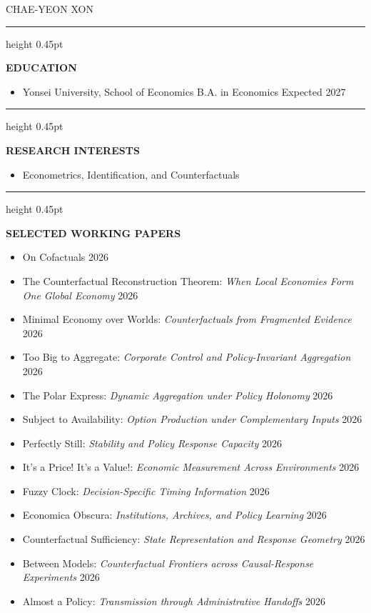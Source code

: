 \documentclass[11pt,letterpaper]{article}
\newcommand{\cvsection}[1]{%
  \par\vspace{0.24in}%
  {\color{cvgray}\hrule height 0.45pt}
  \vspace{0.16in}%
  {\color{cvgray}\fontsize{9.2}{11}\selectfont\bfseries\MakeUppercase{#1}}%
  \par\vspace{0.11in}%
}
\newcommand{\firstcvsection}[1]{%
  \par\vspace{0.11in}%
  {\color{cvgray}\hrule height 0.45pt}
  \vspace{0.16in}%
  {\color{cvgray}\fontsize{9.2}{11}\selectfont\bfseries\MakeUppercase{#1}}%
  \par\vspace{0.09in}%
}
\newenvironment{cvitems}{%
  \begin{itemize}[label={\textcolor{cvgray}{--}},leftmargin=0.28in,labelsep=0.09in,itemsep=0.105in,topsep=0pt,parsep=0pt,partopsep=0pt]
}{\end{itemize}}
\newenvironment{cvtightitems}{%
  \begin{itemize}[label={\textcolor{cvgray}{--}},leftmargin=0.28in,labelsep=0.09in,itemsep=0.110in,topsep=0pt,parsep=0pt,partopsep=0pt]
}{\end{itemize}}
\begin{document}
\thispagestyle{fancy}

\begin{center}
  {\fontsize{21}{25}\selectfont{}\selectfont CHAE-YEON XON}
\end{center}
\vspace{0.04in}

\firstcvsection{Education}
\begin{cvitems}
  \item Yonsei University, School of Economics \textbullet{} B.A. in Economics \textbullet{} Expected 2027
\end{cvitems}

\cvsection{Research Interests}
\begin{cvitems}
  \item Econometrics, Identification, and Counterfactuals
\end{cvitems}

\cvsection{Selected Working Papers}
\begin{cvtightitems}
  \item On Cofactuals \textbullet{} 2026
  \item The Counterfactual Reconstruction Theorem: \textit{When Local Economies Form One Global Economy} \textbullet{} 2026
  \item Minimal Economy over Worlds: \textit{Counterfactuals from Fragmented Evidence} \textbullet{} 2026
  \item Too Big to Aggregate: \textit{Corporate Control and Policy-Invariant Aggregation} \textbullet{} 2026
  \item The Polar Express: \textit{Dynamic Aggregation under Policy Holonomy} \textbullet{} 2026
  \item Subject to Availability: \textit{Option Production under Complementary Inputs} \textbullet{} 2026
  \item Perfectly Still: \textit{Stability and Policy Response Capacity} \textbullet{} 2026
  \item It's a Price! It's a Value!: \textit{Economic Measurement Across Environments} \textbullet{} 2026
  \item Fuzzy Clock: \textit{Decision-Specific Timing Information} \textbullet{} 2026
  \item Economica Obscura: \textit{Institutions, Archives, and Policy Learning} \textbullet{} 2026
  \item Counterfactual Sufficiency: \textit{State Representation and Response Geometry} \textbullet{} 2026
  \item Between Models: \textit{Counterfactual Frontiers across Causal-Response Experiments} \textbullet{} 2026
  \item Almost a Policy: \textit{Transmission through Administrative Handoffs} \textbullet{} 2026
\end{cvtightitems}
\end{document}
